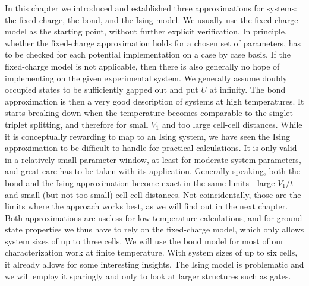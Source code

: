 In this chapter we introduced and established three approximations for
 systems: the fixed-charge, the bond, and the Ising model. We usually
use the fixed-charge model as the starting point, without further explicit
verification. In principle, whether the fixed-charge approximation holds for a
chosen set of parameters, has to be checked for each potential 
implementation on a case by case basis. If the fixed-charge model is not
applicable, then there is also generally no hope of implementing  on
the given experimental system. We generally assume doubly occupied states to be
sufficiently gapped out and put $U$ at infinity. The bond approximation is then
a very good description of  systems at high temperatures. It starts
breaking down when the temperature becomes comparable to the singlet-triplet
splitting, and therefore for small $V_1$ and too large cell-cell distances.
While it is conceptually rewarding to map  to an Ising system, we have
seen the Ising approximation to be difficult to handle for practical
calculations. It is only valid in a relatively small parameter window, at least
for moderate system parameters, and great care has to be taken with its
application. Generally speaking, both the bond and the Ising approximation
become exact in the same limits---large $V_1/t$ and small (but not too small)
cell-cell distances. Not coincidentally, those are the limits where the
 approach works best, as we will find out in the next chapter. Both
approximations are useless for low-temperature calculations, and for ground
state properties we thus have to rely on the fixed-charge model, which only
allows system sizes of up to three cells. We will use the bond model for most of
our  characterization work at finite temperature. With system sizes of
up to six cells, it already allows for some interesting insights. The Ising
model is problematic and we will employ it sparingly and only to look at larger
structures such as gates.
